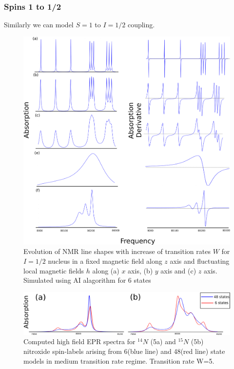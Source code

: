 \subsubsection{Spins 1 to 1/2}\label{coupledspinonesection}
Similarly we can model $S=1$ to $I=1/2$ coupling. 
\begin{figure}[h!]
\centering
\includegraphics[width=1\textwidth]{figures/chap2/spinone.eps}
\caption{Evolution of NMR line shapes with increase of transition rates $W$ for $I=1/2$ nucleus in a fixed magnetic field along $z$ axis and fluctuating local magnetic fields $h$ along (a) $x$ axis, (b) $y$ axis and (c) $z$ axis. Simulated using AI alagorithm for 6 states}
\label{figure:spin05der}
\end{figure}
\begin{figure}[h!]
\centering
\includegraphics[width=1\textwidth]{figures/chap2/spin051moderate.png}
\caption{Computed high field EPR spectra for $^{14}N$ (5a) and $^{15}N$ (5b) nitroxide spin-labels arising from 6(blue line) and 48(red line) state models in medium transition rate regime. Transition rate W=5.}
\label{figure:spin05der1}
\end{figure}
